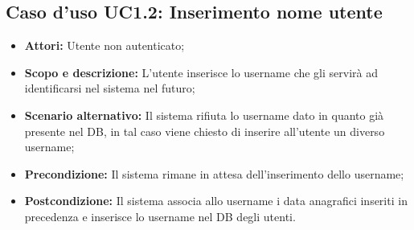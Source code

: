 \documentclass[12pt,a4paper,titlepage]{article}
\begin{document}
\subsection{Caso d'uso UC1.2: Inserimento nome utente}
\begin{itemize}
	\item \textbf{Attori: }Utente non autenticato;
	\item \textbf{Scopo e descrizione: }L'utente inserisce lo username che gli servirà ad identificarsi nel sistema nel futuro;
	\item \textbf{Scenario alternativo: }Il sistema rifiuta lo username dato in quanto già presente nel DB, in tal caso viene chiesto di inserire all'utente un diverso username;
	\item \textbf{Precondizione: }Il sistema rimane in attesa dell'inserimento dello username;
	\item \textbf{Postcondizione: }Il sistema associa allo username i data anagrafici inseriti in precedenza e inserisce lo username nel DB degli utenti.
\end{itemize}
\end{document}
